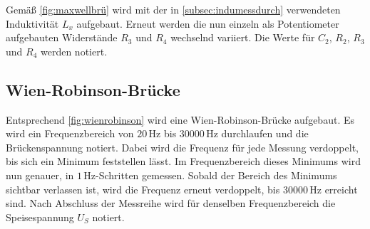 Gemäß \autoref{fig:maxwellbrü} wird mit der in \autoref{subsec:indumessdurch} verwendeten 
Induktivität $L_x$ aufgebaut. 
Erneut werden die nun einzeln als Potentiometer aufgebauten Widerstände $R_3$ und $R_4$ wechselnd variiert.
Die Werte für $C_2$, $R_2$, $R_3$ und $R_4$ werden notiert.


\subsection{Wien-Robinson-Brücke}

Entsprechend \autoref{fig:wienrobinson} wird eine Wien-Robinson-Brücke aufgebaut.
Es wird ein Frequenzbereich von $20 \, \unit{\hertz}$ bis $30000 \, \unit{\hertz}$ durchlaufen und die
Brückenspannung notiert.
Dabei wird die Frequenz für jede Messung verdoppelt, bis sich ein Minimum feststellen lässt.
Im Frequenzbereich dieses Minimums wird nun genauer, in $1 \, \unit{\hertz}$-Schritten gemessen.
Sobald der Bereich des Minimums sichtbar verlassen ist, wird die Frequenz erneut verdoppelt, bis 
$30000 \, \unit{\hertz}$ erreicht sind.
Nach Abschluss der Messreihe wird für denselben Frequenzbereich die Speisespannung $U_S$ notiert.


